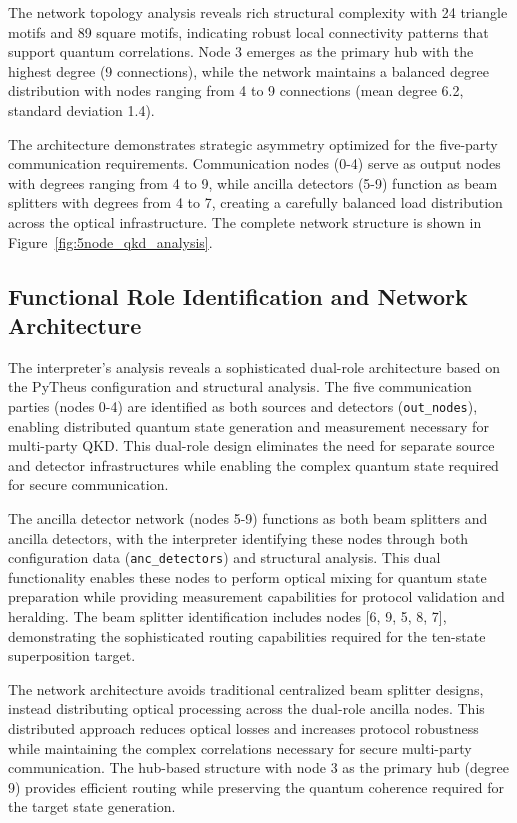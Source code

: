 \documentclass[11pt,a4paper]{article}
\begin{document}
The network topology analysis reveals rich structural complexity with 24 triangle motifs and 89 square motifs, indicating robust local connectivity patterns that support quantum correlations. Node 3 emerges as the primary hub with the highest degree (9 connections), while the network maintains a balanced degree distribution with nodes ranging from 4 to 9 connections (mean degree 6.2, standard deviation 1.4).

The architecture demonstrates strategic asymmetry optimized for the five-party communication requirements. Communication nodes (0-4) serve as output nodes with degrees ranging from 4 to 9, while ancilla detectors (5-9) function as beam splitters with degrees from 4 to 7, creating a carefully balanced load distribution across the optical infrastructure. The complete network structure is shown in Figure~\ref{fig:5node_qkd_analysis}.

\subsection{Functional Role Identification and Network Architecture}

The interpreter's analysis reveals a sophisticated dual-role architecture based on the PyTheus configuration and structural analysis. The five communication parties (nodes 0-4) are identified as both sources and detectors (\texttt{out\_nodes}), enabling distributed quantum state generation and measurement necessary for multi-party QKD. This dual-role design eliminates the need for separate source and detector infrastructures while enabling the complex quantum state required for secure communication.

The ancilla detector network (nodes 5-9) functions as both beam splitters and ancilla detectors, with the interpreter identifying these nodes through both configuration data (\texttt{anc\_detectors}) and structural analysis. This dual functionality enables these nodes to perform optical mixing for quantum state preparation while providing measurement capabilities for protocol validation and heralding. The beam splitter identification includes nodes [6, 9, 5, 8, 7], demonstrating the sophisticated routing capabilities required for the ten-state superposition target.

The network architecture avoids traditional centralized beam splitter designs, instead distributing optical processing across the dual-role ancilla nodes. This distributed approach reduces optical losses and increases protocol robustness while maintaining the complex correlations necessary for secure multi-party communication. The hub-based structure with node 3 as the primary hub (degree 9) provides efficient routing while preserving the quantum coherence required for the target state generation.
\end{document}
